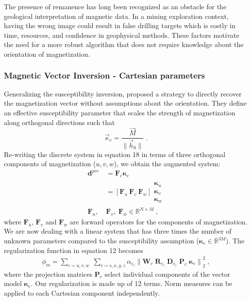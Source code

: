 \documentclass[paper]{geophysics}
\begin{document}
The presence of remanence has long been recognized as an obstacle for the geological interpretation of magnetic data.
In a mining exploration context, having the wrong image could result in false drilling targets which is costly in time, resources, and confidence in geophysical methods.
These factors motivate the need for a more robust algorithm that does not require knowledge about the orientation of magnetization.

\subsubsection{Magnetic Vector Inversion - Cartesian parameters}
Generalizing the susceptibility inversion, \cite{LelievreOldenburg2009}
proposed a strategy to directly recover the magnetization vector without assumptions about the orientation. They define an effective susceptibility parameter that scales the strength of magnetization along orthogonal directions such that
\begin{equation}
\vec \kappa_e = \frac{\vec{M}}{\|\vec{h}_0\|} \;.
\end{equation}
Re-writing the discrete system in equation 18 in terms of three orthogonal components of magnetization ($u, v, w$), we obtain the augmented system:
\begin{equation}\label{MVIlinear}
\begin{split}
\mathbf{d}^{pre} &= \mathbf{F}_{e} \boldsymbol{\kappa}_e \\
&= [ \mathbf{F}_u \: \mathbf{F}_v \: \mathbf{F}_w]
\begin{matrix}
\boldsymbol{\kappa}_{u}\\
\boldsymbol{\kappa}_{v}\\
\boldsymbol{\kappa}_{w}
\end{matrix} \\
\mathbf{F}_u,\; &\mathbf{F}_v, \;\mathbf{F}_w \in \mathbb{R}^{N \times M} \;,
\end{split}
\end{equation}
where $\mathbf{F}_u$, $\mathbf{F}_v$ and $\mathbf{F}_w$ are forward operators for the components of magnetization.
We are now dealing with a linear system that has three times the number of unknown parameters compared to the susceptibility assumption ($\boldsymbol{\kappa}_e \in \mathbb{R}^{3M}$). The regularization function in equation 12 becomes
\begin{equation} \label{phi_m_sparse_3C}
\begin{split}
\phi_m = \sum_{c = u,v,w} \;
\sum_{r = s,x,y,z} \alpha_{c_r} {\|\mathbf{W}_r \;\mathbf{R}_{c_r} \; \mathbf{D}_{c_r} \;\mathbf{P}_{c} \; \boldsymbol{\kappa}_e\|}^2_2 \;,
\end{split}
\end{equation}
where the projection matrices $\mathbf{P}_{c}$ select individual components of the vector model $\boldsymbol{\kappa}_e$. Our regularization is made up of 12 terms. Norm measures can be applied to each Cartesian component independently.
\end{document}
